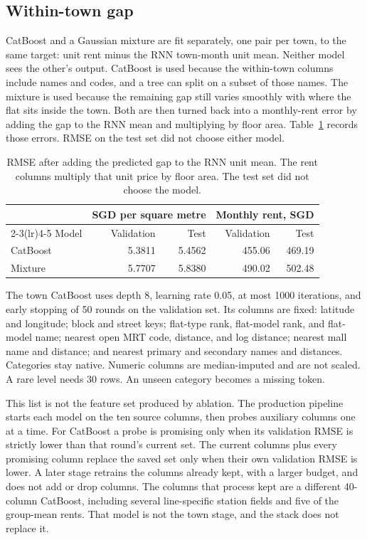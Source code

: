 \documentclass[11pt]{article}
\begin{document}
\subsection{Within-town gap}

CatBoost and a Gaussian mixture are fit separately, one pair per town, to the same target: unit rent minus the RNN town-month unit mean.
Neither model sees the other's output.
CatBoost is used because the within-town columns include names and codes, and a tree can split on a subset of those names.
The mixture is used because the remaining gap still varies smoothly with where the flat sits inside the town.
Both are then turned back into a monthly-rent error by adding the gap to the RNN mean and multiplying by floor area.
Table~\ref{tab:gap} records those errors.
RMSE on the test set did not choose either model.

\begin{table}[ht]
\centering
\caption{RMSE after adding the predicted gap to the RNN unit mean.
The rent columns multiply that unit price by floor area.
The test set did not choose the model.}
\label{tab:gap}
\begin{tabular}{lrrrr}
\toprule
 & \multicolumn{2}{c}{SGD per square metre} & \multicolumn{2}{c}{Monthly rent, SGD} \\
\cmidrule(lr){2-3}\cmidrule(lr){4-5}
Model & Validation & Test & Validation & Test \\
\midrule
CatBoost & 5.3811 & 5.4562 & 455.06 & 469.19 \\
Mixture & 5.7707 & 5.8380 & 490.02 & 502.48 \\
\bottomrule
\end{tabular}
\end{table}

The town CatBoost uses depth 8, learning rate 0.05, at most 1000 iterations, and early stopping of 50 rounds on the validation set.
Its columns are fixed: latitude and longitude; block and street keys; flat-type rank, flat-model rank, and flat-model name; nearest open MRT code, distance, and log distance; nearest mall name and distance; and nearest primary and secondary names and distances.
Categories stay native.
Numeric columns are median-imputed and are not scaled.
A rare level needs 30 rows.
An unseen category becomes a missing token.

This list is not the feature set produced by ablation.
The production pipeline starts each model on the ten source columns, then probes auxiliary columns one at a time.
For CatBoost a probe is promising only when its validation RMSE is strictly lower than that round's current set.
The current columns plus every promising column replace the saved set only when their own validation RMSE is lower.
A later stage retrains the columns already kept, with a larger budget, and does not add or drop columns.
The columns that process kept are a different 40-column CatBoost, including several line-specific station fields and five of the group-mean rents.
That model is not the town stage, and the stack does not replace it.
\end{document}

